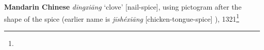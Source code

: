 \begin{etymology}\label{ety:dingxiang}
\textbf{Mandarin Chinese}  \textit{dīngxiāng} `clove' [nail-spice], using pictogram after the shape of the spice (earlier name is  \textit{jīshéxiāng} [chicken-tongue-spice]  ), 1321\footnote{}
\end{etymology}